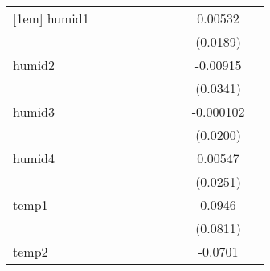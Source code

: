 {\begin{tabular}{l*{9}{c}}
[1em]
humid1      &                     &                     &                     &                     &                     &                     &                     &     0.00532         &                     \\
            &                     &                     &                     &                     &                     &                     &                     &    (0.0189)         &                     \\
[1em]
humid2      &                     &                     &                     &                     &                     &                     &                     &    -0.00915         &                     \\
            &                     &                     &                     &                     &                     &                     &                     &    (0.0341)         &                     \\
[1em]
humid3      &                     &                     &                     &                     &                     &                     &                     &   -0.000102         &                     \\
            &                     &                     &                     &                     &                     &                     &                     &    (0.0200)         &                     \\
[1em]
humid4      &                     &                     &                     &                     &                     &                     &                     &     0.00547         &                     \\
            &                     &                     &                     &                     &                     &                     &                     &    (0.0251)         &                     \\
[1em]
temp1       &                     &                     &                     &                     &                     &                     &                     &      0.0946         &                     \\
            &                     &                     &                     &                     &                     &                     &                     &    (0.0811)         &                     \\
[1em]
temp2       &                     &                     &                     &                     &                     &                     &                     &     -0.0701\sym{*}  &                     \\

\end{tabular}}
